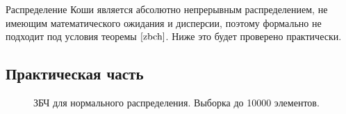 \documentclass[12pt, a4paper]{article}
\begin{document}
Распределение Коши является абсолютно непрерывным распределением, не имеющим математического ожидания и дисперсии, поэтому формально не подходит под условия теоремы $\ref{zbch}$. Ниже это будет проверено практически.

\subsection{Практическая часть}
\begin{figure}[H]
\caption{ЗБЧ для нормального распределения. Выборка до 10000 элементов.}
\end{figure}
\end{document}
